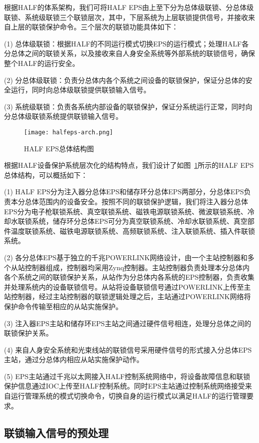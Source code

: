 根据HALF的体系架构，我们可将HALF EPS由上至下分为总体级联锁、分总体级联锁、系统级联锁三个联锁层次，其中，下层系统为上层联锁提供信号，并接收来自上层的联锁保护命令。三个层次的联锁功能具体如下：

(1) 总体级联锁：根据HALF的不同运行模式切换EPS的运行模式；处理HALF各分总体之间的联锁关系，以及接收来自人身安全系统等外部系统的联锁信号，确保整个HALF的运行安全。

(2) 分总体级联锁：负责分总体内各个系统之间设备的联锁保护，保证分总体的安全运行，同时向总体级联锁提供联锁输入信号。

(3) 系统级联锁：负责各系统内部设备的联锁保护，保证分系统运行正常，同时向分总体级联锁系统提供联锁输入信号。

\begin{figure}[!htb]
	\centering
	\texttt{[image: halfeps-arch.png]}
	\caption{HALF EPS总体结构图}
	\label{fig:halfeps-arch}
\end{figure}

根据HALF设备保护系统层次化的结构特点，我们设计了如图~\ref{fig:halfeps-arch}所示的HALF EPS总体结构，可以概括如下：

(1) HALF EPS分为注入器分总体EPS和储存环分总体EPS两部分，分总体EPS负责本分总体范围内的设备安全。按照不同的联锁保护逻辑，我们将注入器分总体EPS分为电子枪联锁系统、真空联锁系统、磁铁电源联锁系统、微波联锁系统、冷却水联锁系统，储存环分总体EPS可分为真空联锁系统、冷却水联锁系统、真空部件温度联锁系统、磁铁电源联锁系统、高频联锁系统、注入联锁系统、插入件联锁系统。

(2) 各分总体EPS基于独立的千兆POWERLINK网络设计，由一个主站控制器和多个从站控制器组成，控制器均采用Zynq控制器。主站控制器负责处理本分总体内各个系统之间的联锁保护关系，从站作为分总体内各系统的EPS控制器，负责收集并处理系统内的设备联锁信号。从站将设备联锁信号通过POWERLINK上传至主站控制器，经过主站控制器的联锁逻辑处理之后，主站通过POWERLINK网络将保护命令传输至相应的从站实施保护。

(3) 注入器EPS主站和储存环EPS主站之间通过硬件信号相连，处理分总体之间的联锁保护关系。

(4) 来自人身安全系统和光束线站的联锁信号采用硬件信号的形式接入分总体EPS主站，通过分总体内相应从站实施保护动作。

(5) EPS主站通过千兆以太网接入HALF控制系统网络中，将设备故障信息和联锁保护信息通过IOC上传至HALF控制系统。同时EPS主站通过控制系统网络接受来自运行管理系统的模式切换命令，切换自身的运行模式以满足HALF的运行管理要求。

\subsection{联锁输入信号的预处理}

